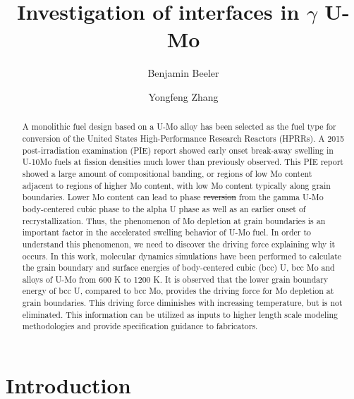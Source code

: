 \documentclass[review]{elsarticle}
\providecommand{\DIFaddtex}[1]{{\protect\color{blue}\uwave{#1}}} %
\providecommand{\DIFdeltex}[1]{{\protect\color{red}\sout{#1}}}                      %
\providecommand{\DIFaddbegin}{} %
\providecommand{\DIFaddend}{} %
\providecommand{\DIFdelbegin}{} %
\providecommand{\DIFdelend}{} %
\providecommand{\DIFadd}[1]{\texorpdfstring{\DIFaddtex{#1}}{#1}} %
\providecommand{\DIFdel}[1]{\texorpdfstring{\DIFdeltex{#1}}{}} %
\newcommand{\DIFscaledelfig}{0.5}
\newlength{\DIFdelgraphicswidth} %
\newlength{\DIFdelgraphicsheight} %
\newcommand{\DIFaddincludegraphics}[2][]{{\color{blue}\fbox{\DIFOincludegraphics[#1]{#2}}}} %
\newcommand{\DIFdelincludegraphics}[2][]{%
\sbox{\DIFdelgraphicsbox}{\DIFOincludegraphics[#1]{#2}}%
\settoboxwidth{\DIFdelgraphicswidth}{\DIFdelgraphicsbox} %
\settoboxtotalheight{\DIFdelgraphicsheight}{\DIFdelgraphicsbox} %
\scalebox{\DIFscaledelfig}{%
\parbox[b]{\DIFdelgraphicswidth}{\usebox{\DIFdelgraphicsbox}\\[-\baselineskip] \rule{\DIFdelgraphicswidth}{0em}}\llap{\resizebox{\DIFdelgraphicswidth}{\DIFdelgraphicsheight}{%
\setlength{\unitlength}{\DIFdelgraphicswidth}%
\begin{picture}(1,1)%
\thicklines\linethickness{2pt} %
{\color[rgb]{1,0,0}\put(0,0){\framebox(1,1){}}}%
{\color[rgb]{1,0,0}\put(0,0){\line( 1,1){1}}}%
{\color[rgb]{1,0,0}\put(0,1){\line(1,-1){1}}}%
\end{picture}%
}\hspace*{3pt}}} %
} %
\DeclareRobustCommand{\DIFaddbegin}{\DIFOaddbegin \let\includegraphics\DIFaddincludegraphics} %
\DeclareRobustCommand{\DIFaddend}{\DIFOaddend \let\includegraphics\DIFOincludegraphics} %
\DeclareRobustCommand{\DIFdelbegin}{\DIFOdelbegin \let\includegraphics\DIFdelincludegraphics} %
\DeclareRobustCommand{\DIFdelend}{\DIFOaddend \let\includegraphics\DIFOincludegraphics} %
\begin{document}
\begin{frontmatter}
\title{Investigation of interfaces in $\gamma$ U-Mo}

\author[inl]{Benjamin Beeler}
\author[inl]{Yongfeng Zhang}
\DIFaddbegin \author[inl]{\DIFadd{Yipeng Gao}}
\DIFaddend \address[inl]{Idaho National Laboratory, Idaho Falls, ID 83415}


\begin{abstract}
A monolithic fuel design based on a U-Mo alloy has been selected as the fuel type for conversion of the United States High-Performance Research Reactors (HPRRs). A 2015 post-irradiation examination (PIE) report showed early onset break-away swelling in U-10Mo fuels at fission densities much lower than previously observed. This PIE report showed a large amount of compositional banding, or regions of low Mo content adjacent to regions of higher Mo content, with low Mo content typically along grain boundaries. Lower Mo content can lead to phase \DIFdelbegin \DIFdel{reversion }\DIFdelend \DIFaddbegin \DIFadd{decomposition }\DIFaddend from the gamma U-Mo body-centered cubic phase to the alpha U phase as well as an earlier onset of recrystallization. Thus, the phenomenon of Mo depletion at grain boundaries is an important factor in the accelerated swelling behavior of U-Mo fuel. In order to understand this phenomenon, we need to discover the driving force explaining why it occurs. In this work, molecular dynamics simulations have been performed to calculate the grain boundary and surface energies of body-centered cubic (bcc) U, bcc Mo and alloys of U-Mo from 600 K to 1200 K. It is observed that the lower grain boundary energy of bcc U, compared to bcc Mo, provides the driving force for Mo depletion at grain boundaries. This driving force diminishes with increasing temperature, but is not eliminated. This information can be utilized as inputs to higher length scale modeling methodologies and provide specification guidance to fabricators.
\end{abstract}
\end{frontmatter}

\linenumbers
\modulolinenumbers[5]

\section{Introduction}
\end{document}
